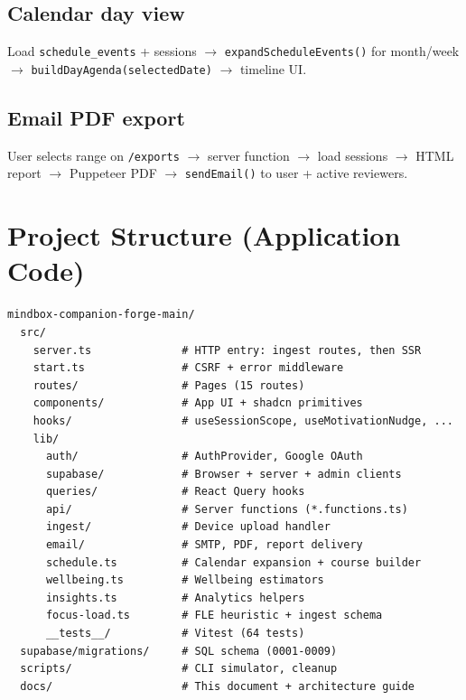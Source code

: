 \documentclass[11pt,a4paper]{article}
\newcommand{\filepath}[1]{\texttt{#1}}
\begin{document}
\subsection{Calendar day view}

Load \texttt{schedule\_events} + sessions $\rightarrow$ \texttt{expandScheduleEvents()} for month/week
$\rightarrow$ \texttt{buildDayAgenda(selectedDate)} $\rightarrow$ timeline UI.

\subsection{Email PDF export}

User selects range on \filepath{/exports} $\rightarrow$ server function $\rightarrow$
load sessions $\rightarrow$ HTML report $\rightarrow$ Puppeteer PDF $\rightarrow$
\texttt{sendEmail()} to user + active reviewers.

\section{Project Structure (Application Code)}

\begin{lstlisting}
mindbox-companion-forge-main/
  src/
    server.ts              # HTTP entry: ingest routes, then SSR
    start.ts               # CSRF + error middleware
    routes/                # Pages (15 routes)
    components/            # App UI + shadcn primitives
    hooks/                 # useSessionScope, useMotivationNudge, ...
    lib/
      auth/                # AuthProvider, Google OAuth
      supabase/            # Browser + server + admin clients
      queries/             # React Query hooks
      api/                 # Server functions (*.functions.ts)
      ingest/              # Device upload handler
      email/               # SMTP, PDF, report delivery
      schedule.ts          # Calendar expansion + course builder
      wellbeing.ts         # Wellbeing estimators
      insights.ts          # Analytics helpers
      focus-load.ts        # FLE heuristic + ingest schema
      __tests__/           # Vitest (64 tests)
  supabase/migrations/     # SQL schema (0001-0009)
  scripts/                 # CLI simulator, cleanup
  docs/                    # This document + architecture guide
\end{lstlisting}
\end{document}

